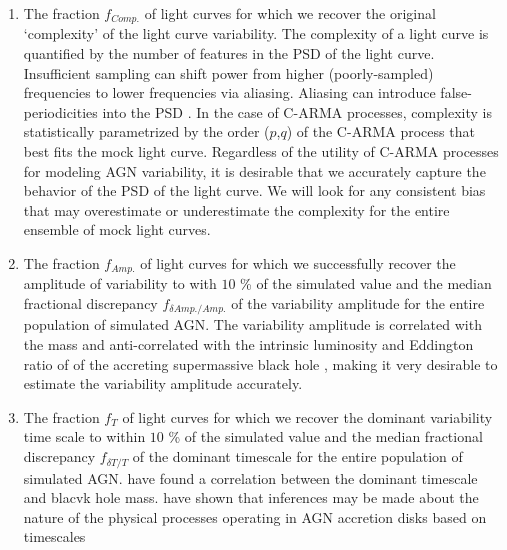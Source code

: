 \documentclass[times,preprint]{aastex}
\begin{document}
\begin{enumerate}

\item The fraction $f_{Comp.}$ of light curves for which we recover the original `complexity' of the light curve variability.
The complexity of a light curve is quantified by the number of features in the PSD of the light curve. Insufficient sampling can shift power from higher (poorly-sampled) frequencies to lower frequencies via aliasing. Aliasing can introduce false-periodicities into the PSD \citep{FalsePeriodicities}. In the case of C-ARMA processes, complexity is statistically parametrized by the order ($p$,$q$) of the C-ARMA process that best fits the mock light curve. Regardless of the utility of C-ARMA processes for modeling AGN variability, it is desirable that we accurately capture the behavior of the PSD of the light curve. We will look for any consistent bias that may overestimate or underestimate the complexity for the entire ensemble of mock light curves.

\item The fraction $f_{Amp.}$ of light curves for which we successfully recover the amplitude of variability to with $10$ \% of the simulated value and the median fractional discrepancy $f_{\delta Amp./Amp.}$ of the variability amplitude for the entire population of simulated AGN. The variability amplitude is correlated with the mass and anti-correlated with the intrinsic luminosity and Eddington ratio of of the accreting supermassive black hole \citep{MacLeod10}, making it very desirable to estimate the variability amplitude accurately.

\item The fraction $f_{T}$ of light curves for which we recover the dominant variability time scale to within $10$ \% of the simulated value and the median fractional discrepancy $f_{\delta T/T}$ of the dominant timescale for the entire population of simulated AGN. \citet{MacLeod10} have found a correlation between the dominant timescale and blacvk hole mass. \citet{Kelly09} have shown that inferences may be made about the nature of the physical processes operating in AGN accretion disks based on timescales 

\end{enumerate}

\medskip



\end{document}
